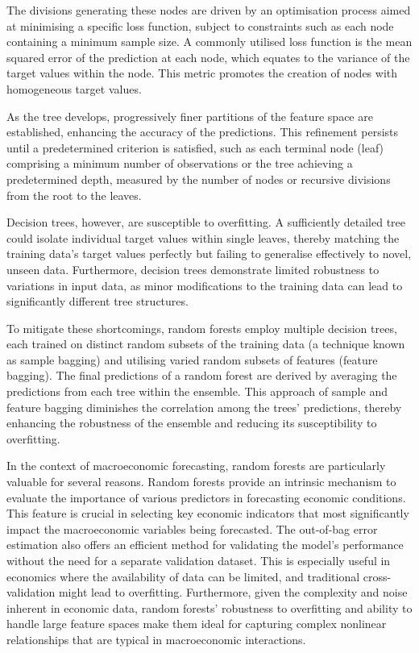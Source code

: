 The divisions generating these nodes are driven by an optimisation process aimed at minimising a specific loss function, subject to constraints such as each node containing a minimum sample size. A commonly utilised loss function is the mean squared error of the prediction at each node, which equates to the variance of the target values within the node. This metric promotes the creation of nodes with homogeneous target values.

As the tree develops, progressively finer partitions of the feature space are established, enhancing the accuracy of the predictions. This refinement persists until a predetermined criterion is satisfied, such as each terminal node (leaf) comprising a minimum number of observations or the tree achieving a predetermined depth, measured by the number of nodes or recursive divisions from the root to the leaves.

Decision trees, however, are susceptible to overfitting. A sufficiently detailed tree could isolate individual target values within single leaves, thereby matching the training data's target values perfectly but failing to generalise effectively to novel, unseen data. Furthermore, decision trees demonstrate limited robustness to variations in input data, as minor modifications to the training data can lead to significantly different tree structures.

To mitigate these shortcomings, random forests employ multiple decision trees, each trained on distinct random subsets of the training data (a technique known as sample bagging) and utilising varied random subsets of features (feature bagging). The final predictions of a random forest are derived by averaging the predictions from each tree within the ensemble. This approach of sample and feature bagging diminishes the correlation among the trees' predictions, thereby enhancing the robustness of the ensemble and reducing its susceptibility to overfitting.

In the context of macroeconomic forecasting, random forests are particularly valuable for several reasons. Random forests provide an intrinsic mechanism to evaluate the importance of various predictors in forecasting economic conditions. This feature is crucial in selecting key economic indicators that most significantly impact the macroeconomic variables being forecasted. The out-of-bag error estimation also offers an efficient method for validating the model’s performance without the need for a separate validation dataset. This is especially useful in economics where the availability of data can be limited, and traditional cross-validation might lead to overfitting. Furthermore, given the complexity and noise inherent in economic data, random forests’ robustness to overfitting and ability to handle large feature spaces make them ideal for capturing complex nonlinear relationships that are typical in macroeconomic interactions.



